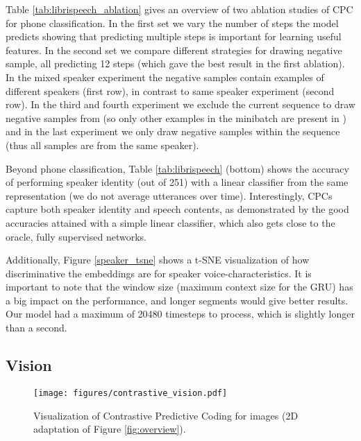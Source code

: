 Table \ref{tab:librispeech_ablation} gives an overview of two ablation studies of CPC for phone classification. In the first set we vary the number of steps the model predicts showing that predicting multiple steps is important for learning useful features. In the second set we compare different strategies for drawing negative sample, all predicting 12 steps (which gave the best result in the first ablation). In the mixed speaker experiment the negative samples contain examples of different speakers (first row), in contrast to same speaker experiment (second row). In the third and fourth experiment we exclude the current sequence to draw negative samples from (so only other examples in the minibatch are present in ) and in the last experiment we only draw negative samples within the sequence (thus all samples are from the same speaker).

Beyond phone classification, Table \ref{tab:librispeech} (bottom) shows the accuracy of performing speaker identity (out of 251) with a linear classifier from the same representation (we do not average utterances over time). Interestingly, CPCs capture both speaker identity and speech contents, as demonstrated by the good accuracies attained with a simple linear classifier, which also gets close to the oracle, fully supervised networks.

Additionally, Figure \ref{speaker_tsne} shows a t-SNE visualization \cite{maaten2008visualizing} of how discriminative the embeddings are for speaker voice-characteristics.
It is important to note that the window size (maximum context size for the GRU) has a big impact on the performance, and longer segments would give better results. Our model had a maximum of 20480 timesteps to process, which is slightly longer than a second.

\subsection{Vision}

\begin{figure*}[t!]
  \center
  \texttt{[image: figures/contrastive\_vision.pdf]}
  \caption{Visualization of Contrastive Predictive Coding for images (2D adaptation of Figure \ref{fig:overview}).}
  \label{fig:overview_img}
\end{figure*}

